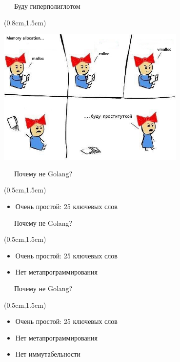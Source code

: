 \documentclass[xetex,18pt,aspectratio=43]{beamer}
\begin{document}
\begin{Large}
\begin{frame}{\ \ \ Буду гиперполиглотом}
\begin{textblock*}{\framewidth}(0.8cm,1.5cm)
  \href{http://hyperpolyglot.org}{\color{blue}{http://hyperpolyglot.org}}\\
\begin{minipage}{\textwidth}
  \centering
  \includegraphics[height=6.8cm]{img/malloc}
\end{minipage}
\end{textblock*}
\end{frame}

\begin{frame}{\ \ \ Почему не Golang?}
\begin{textblock*}{\framewidth-0.8cm}(0.5cm,1.5cm)
\begin{itemize}
  \item Очень простой: 25 ключевых слов
\end{itemize}
\end{textblock*}
\end{frame}

\begin{frame}{\ \ \ Почему не Golang?}
\begin{textblock*}{\framewidth-0.8cm}(0.5cm,1.5cm)
\begin{itemize}
  \item Очень простой: 25 ключевых слов
  \item Нет метапрограммирования
\end{itemize}
\end{textblock*}
\end{frame}

\begin{frame}{\ \ \ Почему не Golang?}
\begin{textblock*}{\framewidth-0.8cm}(0.5cm,1.5cm)
\begin{itemize}
  \item Очень простой: 25 ключевых слов
  \item Нет метапрограммирования
  \item Нет иммутабельности
\end{itemize}
\end{textblock*}
\end{frame}


\end{Large}
\end{document}
